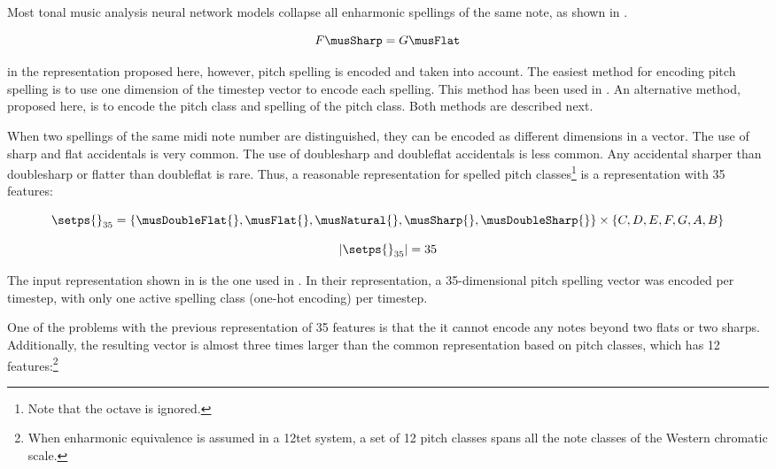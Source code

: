 
Most tonal music analysis neural network models collapse all
enharmonic spellings of the same note, as shown in
.

\begin{equation}
    \label{eq:enharmonicity}
    F\musSharp = G\musFlat
\end{equation}

in the representation proposed here, however, pitch spelling
is encoded and taken into account. The easiest method for
encoding pitch spelling is to use one dimension of the
timestep vector to encode each spelling. This method has
been used in \textcite{micchi2020not, micchi2021deep}. An
alternative method, proposed here, is to encode the pitch
class and spelling of the pitch class. Both methods are
described next.


When two spellings of the same \gls{midi} note number are
distinguished, they can be encoded as different dimensions
in a vector. The use of \gls{sharp} and \gls{flat}
accidentals is very common. The use of \gls{doublesharp} and
\gls{doubleflat} accidentals is less common. Any accidental
sharper than \gls{doublesharp} or flatter than
\gls{doubleflat} is rare. Thus, a reasonable representation
for spelled pitch classes\footnote{Note that the octave is
ignored.} is a representation with 35 features:

\begin{equation}
    \label{eq:pitch_spelling_35}
    \setps{}_{35} = \{\musDoubleFlat{}, \musFlat{}, 
    \musNatural{}, \musSharp{}, \musDoubleSharp{} \}
    \times 
    \{C, D, E, F, G, A, B \}
\end{equation}

\begin{equation}
    \label{eq:pitch_spelling_35_magnitude}
    | \setps{}_{35} | = 35
\end{equation}

The input representation shown in 
is the one used in \textcite{micchi2020not, micchi2021deep}.
In their representation, a 35-dimensional pitch spelling
vector was encoded per timestep, with only one active
spelling class (one-hot encoding) per timestep.


One of the problems with the previous representation of 35
features is that the it cannot encode any notes beyond two
flats or two sharps. Additionally, the resulting vector is
almost three times larger than the common representation
based on pitch classes, which has 12 features:\footnote{When
enharmonic equivalence is assumed in a \gls{12tet} system, a
set of 12 pitch classes spans all the note classes of the
Western chromatic scale.}

